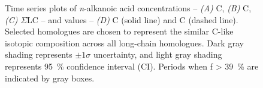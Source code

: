 \begin{figure}[p]
	\caption[\textit{n}-alkanoic acid concentration and  time-series plots]{Time series plots of \textit{n}-alkanoic acid concentrations -- \textit{(A)} C, \textit{(B)} C, \textit{(C)} $\Sigma$LC -- and  values -- \textit{(D)} C (solid line) and C (dashed line). Selected homologues are chosen to represent the similar C-like isotopic composition across all long-chain homologues. Dark gray shading represents $\pm 1\sigma$ uncertainty, and light gray shading represents \SI{95}{\%} confidence interval (CI). Periods when f \SI{> 39}{\%} are indicated by gray boxes.}
	\label{Ch4Fig:7}
\end{figure}


